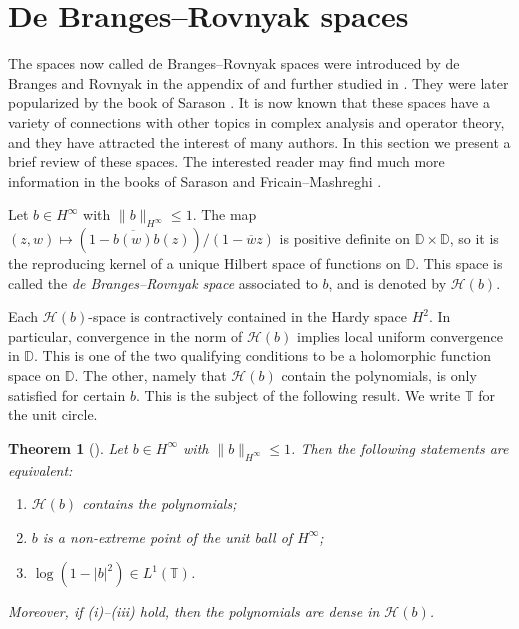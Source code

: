 \documentclass[11pt,reqno]{amsart}
\theoremstyle{plain}
\newtheorem{theorem}{Theorem}[section]
\theoremstyle{definition}
\theoremstyle{remark}
\newcommand{\cH}{\mathcal{H}}
\newcommand{\DD}{\mathbb{D}}
\newcommand{\TT}{\mathbb{T}}
\begin{document}

\section{De Branges--Rovnyak spaces}\label{S:deBR}


The spaces now called de Branges--Rovnyak spaces 
were introduced by de Branges and Rovnyak 
in the appendix of \cite{dBR66a} 
and further studied in \cite{dBR66b}.
They were later popularized by the book of Sarason \cite{Sa94}.
It is now known that these spaces have a variety of connections 
with other topics in complex analysis and operator theory,
and they have attracted the interest of many authors.
In this section we present  a brief review of these spaces.
The interested reader may find much more information in the books
of Sarason \cite{Sa94} and Fricain--Mashreghi \cite{FM16}.


Let $b\in H^\infty$ with $\|b\|_{H^\infty}\le 1$. 
The map $(z,w)\mapsto (1-\overline{b(w)}b(z))/(1-\overline{w}z)$ is
positive definite on $\DD\times\DD$, so it is the reproducing kernel 
of a unique Hilbert  space of functions on $\DD$. This space is
called the \emph{de Branges--Rovnyak space} associated to $b$,
and is denoted by $\cH(b)$. 

Each $\cH(b)$-space is  contractively contained
in the Hardy space $H^2$. 
In particular, convergence in the norm of $\cH(b)$
implies local uniform convergence in $\DD$.
This is one of the two qualifying conditions to be 
a holomorphic function space on $\DD$.
The other, namely that $\cH(b)$ contain the polynomials, 
is only satisfied for certain $b$. This is the subject of the 
following result. We write $\TT$ for the unit circle.

\begin{theorem}[]\label{T:non-extreme}
Let $b\in H^\infty$ with $\|b\|_{H^\infty}\le 1$.
Then the following statements are equivalent:
\begin{enumerate}[\normalfont(i)]
\item $\cH(b)$ contains the polynomials;
\item $b$ is a non-extreme point of the unit ball of $H^\infty$;
\item $\log(1-|b|^2)\in L^1(\TT)$.
\end{enumerate}
Moreover, if (i)--(iii) hold, then
the polynomials are dense in $\cH(b)$.
\end{theorem}
\end{document}
